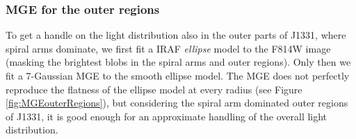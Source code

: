 \documentclass[useAMS,usenatbib]{mnras}
\begin{document}
\subsubsection{MGE for the outer regions}

To get a handle on the light distribution also in the outer parts of J1331, where spiral arms dominate, we first fit a IRAF \citep{1993ASPC...52..173T} \emph{ellipse} model to the F814W image (masking the brightest blobs in the spiral arms and outer regions). Only then we fit a 7-Gaussian MGE to the smooth ellipse model. The MGE does not perfectly reproduce the flatness of the ellipse model at every radius (see Figure \ref{fig:MGEouterRegions}), but considering the spiral arm dominated outer regions of J1331, it is good enough for an approximate handling of the overall light distribution.
\end{document}
